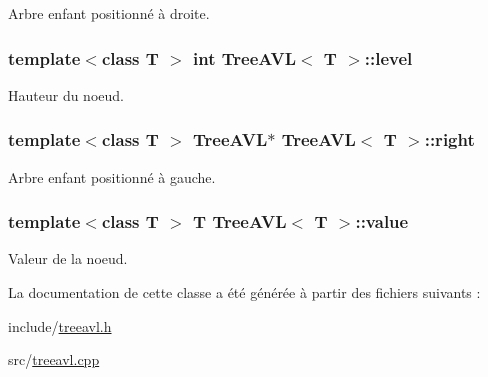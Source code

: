 Arbre enfant positionné à droite. 

\hypertarget{class_tree_a_v_l_a22045a3be7202957c5029defd4312d07}{
\subsubsection[{level}]{\setlength{\rightskip}{0pt plus 5cm}template$<$class T $>$ int {\bf Tree\-A\-V\-L}$<$ T $>$\-::level\hspace{0.3cm}{\ttfamily [private]}}}\label{class_tree_a_v_l_a22045a3be7202957c5029defd4312d07}


Hauteur du noeud. 

\hypertarget{class_tree_a_v_l_aa66f75a7f4a244d08beaaf100987ccc1}{
\subsubsection[{right}]{\setlength{\rightskip}{0pt plus 5cm}template$<$class T $>$ {\bf Tree\-A\-V\-L}$\ast$ {\bf Tree\-A\-V\-L}$<$ T $>$\-::right}}\label{class_tree_a_v_l_aa66f75a7f4a244d08beaaf100987ccc1}


Arbre enfant positionné à gauche. 

\hypertarget{class_tree_a_v_l_a334f2f454d7d64bdc3271fd55d0bda94}{
\subsubsection[{value}]{\setlength{\rightskip}{0pt plus 5cm}template$<$class T $>$ T {\bf Tree\-A\-V\-L}$<$ T $>$\-::value}}\label{class_tree_a_v_l_a334f2f454d7d64bdc3271fd55d0bda94}


Valeur de la noeud. 



La documentation de cette classe a été générée à partir des fichiers suivants \-:\begin{DoxyCompactItemize}
\item 
include/\hyperlink{treeavl_8h}{treeavl.\-h}\item 
src/\hyperlink{treeavl_8cpp}{treeavl.\-cpp}\end{DoxyCompactItemize}
